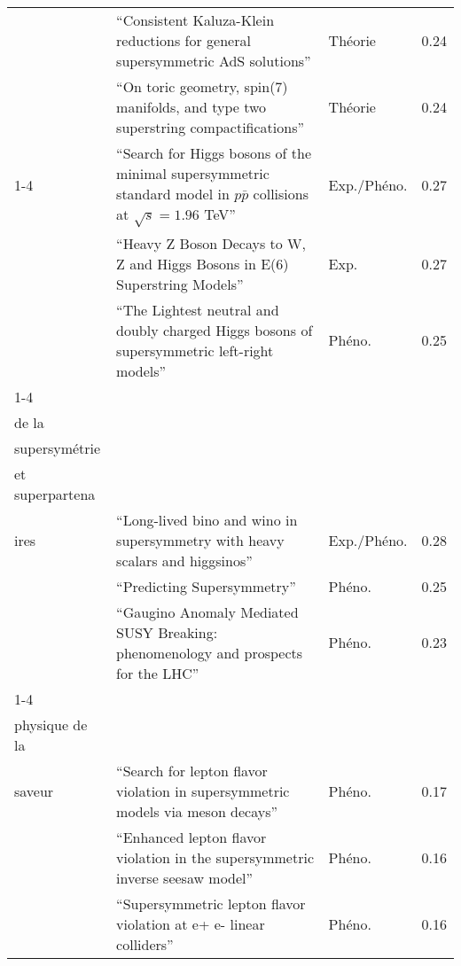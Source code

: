 \begin{longtable}{p{}|p{}|p{}|p{}}
                                                                    & ``Consistent Kaluza-Klein reductions for general supersymmetric AdS solutions'' &      Théorie &         0.24 \\
                                                                    & ``On toric geometry, spin(7) manifolds, and type two superstring compactifications'' &      Théorie &         0.24 \\
\cline{1-4}
\multirow{3}{*}{\begin{tabular}{l}Boson de Higgs\end{tabular}} & ``Search for Higgs bosons of the minimal supersymmetric standard model in $p\bar{p}$ collisions at $\sqrt{s}=1.96$ TeV'' &  Exp./Phéno. &         0.27 \\
                                                                    & ``Heavy Z Boson Decays to W, Z and Higgs Bosons in E(6) Superstring Models'' &         Exp. &         0.27 \\
                                                                    & ``The Lightest neutral and doubly charged Higgs bosons of supersymmetric left-right models'' &       Phéno. &         0.25 \\
\cline{1-4}
\multirow{3}{*}{\begin{tabular}{l}Phénoménologie\\ de la\\ supersymétrie\\ et superpartena\\ ires\end{tabular}} & ``Long-lived bino and wino in supersymmetry with heavy scalars and higgsinos'' &  Exp./Phéno. &         0.28 \\
                                                                    & ``Predicting Supersymmetry'' &       Phéno. &         0.25 \\
                                                                    & ``Gaugino Anomaly Mediated SUSY Breaking: phenomenology and prospects for the LHC'' &       Phéno. &         0.23 \\
\cline{1-4}
\multirow{3}{*}{\begin{tabular}{l}Leptons et\\ physique de la\\ saveur\end{tabular}} & ``Search for lepton flavor violation in supersymmetric models via meson decays'' &       Phéno. &         0.17 \\
                                                                    & ``Enhanced lepton flavor violation in the supersymmetric inverse seesaw model'' &       Phéno. &         0.16 \\
                                                                    & ``Supersymmetric lepton flavor violation at e+ e- linear colliders'' &       Phéno. &         0.16 \\
\end{longtable}
